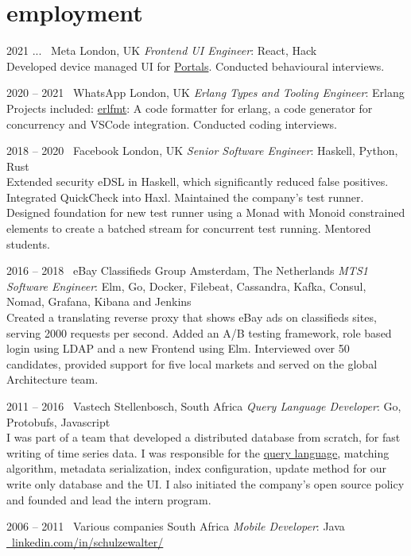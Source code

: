 \documentclass[print]{friggeri-cv-a4} %
\begin{document}
\section{employment}
\begin{entrylist}

\entry
{2021 ...}
{\infty\ Meta}
{London, UK}
{\emph{Frontend UI Engineer}: React, Hack \\
Developed device managed UI for \href{https://portal.facebook.com/business/}{Portals}. Conducted behavioural interviews.
}

\entry
{2020 -- 2021}
{\faWhatsapp\ WhatsApp}
{London, UK}
{\emph{Erlang Types and Tooling Engineer}: Erlang \\
Projects included: \href{https://github.com/whatsapp/erlfmt}{erlfmt}: A code formatter for erlang, a code generator for concurrency and VSCode integration. Conducted coding interviews.
}

\entry
{2018 -- 2020}
{\faFacebookSquare\ Facebook}
{London, UK}
{\emph{Senior Software Engineer}: Haskell, Python, Rust \\
Extended security eDSL in Haskell, which significantly reduced false positives. Integrated QuickCheck into Haxl.
Maintained the company's test runner. Designed foundation for new test runner using a Monad with Monoid constrained elements to create a batched stream for concurrent test running.  Mentored students.
}

\entry
{2016 -- 2018}
{\faShoppingBasket\ eBay Classifieds Group}
{Amsterdam, The Netherlands}
{\emph{MTS1 Software Engineer}: Elm, Go, Docker, Filebeat, Cassandra, Kafka, Consul, Nomad, Grafana, Kibana and Jenkins \\
Created a translating reverse proxy that shows eBay ads on classifieds sites, serving 2000 requests per second. Added an A/B testing framework, role based login using LDAP and a new Frontend using Elm. Interviewed over 50 candidates, provided support for five local markets and served on the global Architecture team.
}

\entry
{2011 -- 2016}
{\faHeadphones\ Vastech}
{Stellenbosch, South Africa}
{\emph{Query Language Developer}: Go, Protobufs, Javascript \\
I was part of a team that developed a distributed database from scratch, for fast writing of time series data. I was responsible for the \href{https://github.com/katydid/katydid}{query language}, matching algorithm, metadata serialization, index configuration, update method for our write only database and the UI. I also initiated the company's open source policy and founded and lead the intern program.
}

\entry
{2006 -- 2011}
{\faMobile\ Various companies}
{South Africa}
{\emph{Mobile Developer}: Java \\
\href{https://www.linkedin.com/in/schulzewalter/}{\faLinkedinSquare\ linkedin.com/in/schulzewalter/}
}

\end{entrylist}
\end{document}
